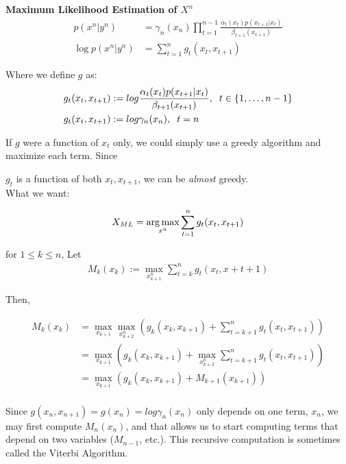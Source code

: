 \documentclass{article}
\begin{document}
	\textbf{Maximum Likelihood Estimation of $X^n$}
	\begin{align*}
		p(x^n | y^n) &= \gamma_n (x_n) \prod_{t=1}^{n-1} \frac{\alpha_t (x_t) p(x_{t+1} | x_t)}{\beta_{t+1} (x_{t+1})}\\
		\log p(x^n | y^n) &= \sum_{t = 1}^{n} g_t (x_t, x_{t+1})
	\end{align*}
	
	Where  we define $g$ as:
	\begin{align*}
		g_t(x_t, x_{t+1}) &:= log \frac{\alpha_t (x_t) p(x_{t+1} | x_t)}{\beta_{t+1}(x_{t+1})}, \hspace{2 mm} t \in \{1, \dots , n-1\}\\
		g_t(x_t, x_{t+1}) &:= log \gamma_n (x_n), \hspace{2 mm } t = n
	\end{align*}	
	
	
	If $g$ were a function of $x_t$ only, we could simply use a greedy algorithm and maximize each term. Since 
	
	$g_t$ is a function of both $x_t, x_{t+1}$, we can be \textit{almost} greedy.\\
	
	What we want:
	
	\begin{align*}
		X_{ML}=\operatorname*{arg\,max}_{x^n} \sum_{t=1}^{n} g_t (x_t , x_{t+1})
	\end{align*}
	
	\begin{definition}
		for $1 \leq k \leq n$, Let
		\begin{align*}
			M_k (x_k) := \max_{x_{k+1}^{n}} \sum_{t=k}^{n} g_t (x_t, x+{t+1})
		\end{align*}
	\end{definition}
	
	Then,
	
	\begin{align*}
		M_k (x_k) &= \max_{x_{k+1}} \max_{x_{k+2}^n} (g_k (x_k, x_{k+1}) + \sum_{t=k+1}^{n} g_t (x_t, x_{t+1}))\\
		&=  \max_{x_{k+1}}  (g_k (x_k, x_{k+1}) + \max_{x_{k+2}^{n}}  \sum_{t=k+1}^{n} g_t (x_t, x_{t+1})  ) \\
		&=  \max_{x_{k+1}}  (g_k (x_k, x_{k+1}) + M_{k+1}(x_{k+1}  ))\\ 
	\end{align*}
	
	Since $g(x_n,x_{n+1})=g(x_n)=log \gamma_n (x_n)$ only depends on one term, $x_n$, we may first compute $M_n(x_n)$, and that allows us to start computing terms that depend on two variables ($M_{n-1}$, etc.). This recursive computation is sometimes called the Viterbi Algorithm.
	
\end{document}
